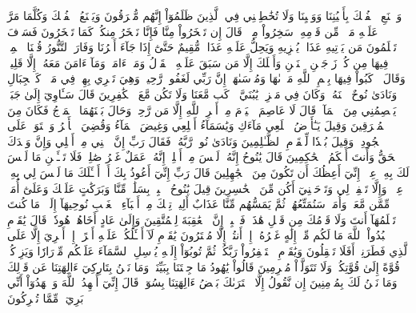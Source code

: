 وَٱصۡنَعِ ٱلۡفُلۡكَ بِأَعۡيُنِنَا وَوَحۡيِنَا وَلَا تُخَٰطِبۡنِي فِي ٱلَّذِينَ ظَلَمُوٓاْ إِنَّهُم مُّغۡرَقُونَ
وَيَصۡنَعُ ٱلۡفُلۡكَ وَكُلَّمَا مَرَّ عَلَيۡهِ مَلَأٞ مِّن قَوۡمِهِۦ سَخِرُواْ مِنۡهُۚ قَالَ إِن تَسۡخَرُواْ مِنَّا فَإِنَّا نَسۡخَرُ مِنكُمۡ كَمَا تَسۡخَرُونَ
فَسَوۡفَ تَعۡلَمُونَ مَن يَأۡتِيهِ عَذَابٞ يُخۡزِيهِ وَيَحِلُّ عَلَيۡهِ عَذَابٞ مُّقِيمٌ
حَتَّىٰٓ إِذَا جَآءَ أَمۡرُنَا وَفَارَ ٱلتَّنُّورُ قُلۡنَا ٱحۡمِلۡ فِيهَا مِن كُلّٖ زَوۡجَيۡنِ ٱثۡنَيۡنِ وَأَهۡلَكَ إِلَّا مَن سَبَقَ عَلَيۡهِ ٱلۡقَوۡلُ وَمَنۡ ءَامَنَۚ وَمَآ ءَامَنَ مَعَهُۥٓ إِلَّا قَلِيلٞ
۞وَقَالَ ٱرۡكَبُواْ فِيهَا بِسۡمِ ٱللَّهِ مَجۡرٜىٰهَا وَمُرۡسَىٰهَآۚ إِنَّ رَبِّي لَغَفُورٞ رَّحِيمٞ
وَهِيَ تَجۡرِي بِهِمۡ فِي مَوۡجٖ كَٱلۡجِبَالِ وَنَادَىٰ نُوحٌ ٱبۡنَهُۥ وَكَانَ فِي مَعۡزِلٖ يَٰبُنَيَّ ٱرۡكَب مَّعَنَا وَلَا تَكُن مَّعَ ٱلۡكَٰفِرِينَ
قَالَ سَـَٔاوِيٓ إِلَىٰ جَبَلٖ يَعۡصِمُنِي مِنَ ٱلۡمَآءِۚ قَالَ لَا عَاصِمَ ٱلۡيَوۡمَ مِنۡ أَمۡرِ ٱللَّهِ إِلَّا مَن رَّحِمَۚ وَحَالَ بَيۡنَهُمَا ٱلۡمَوۡجُ فَكَانَ مِنَ ٱلۡمُغۡرَقِينَ
وَقِيلَ يَـٰٓأَرۡضُ ٱبۡلَعِي مَآءَكِ وَيَٰسَمَآءُ أَقۡلِعِي وَغِيضَ ٱلۡمَآءُ وَقُضِيَ ٱلۡأَمۡرُ وَٱسۡتَوَتۡ عَلَى ٱلۡجُودِيِّۖ وَقِيلَ بُعۡدٗا لِّلۡقَوۡمِ ٱلظَّـٰلِمِينَ
وَنَادَىٰ نُوحٞ رَّبَّهُۥ فَقَالَ رَبِّ إِنَّ ٱبۡنِي مِنۡ أَهۡلِي وَإِنَّ وَعۡدَكَ ٱلۡحَقُّ وَأَنتَ أَحۡكَمُ ٱلۡحَٰكِمِينَ
قَالَ يَٰنُوحُ إِنَّهُۥ لَيۡسَ مِنۡ أَهۡلِكَۖ إِنَّهُۥ عَمَلٌ غَيۡرُ صَٰلِحٖۖ فَلَا تَسۡـَٔلۡنِ مَا لَيۡسَ لَكَ بِهِۦ عِلۡمٌۖ إِنِّيٓ أَعِظُكَ أَن تَكُونَ مِنَ ٱلۡجَٰهِلِينَ
قَالَ رَبِّ إِنِّيٓ أَعُوذُ بِكَ أَنۡ أَسۡـَٔلَكَ مَا لَيۡسَ لِي بِهِۦ عِلۡمٞۖ وَإِلَّا تَغۡفِرۡ لِي وَتَرۡحَمۡنِيٓ أَكُن مِّنَ ٱلۡخَٰسِرِينَ
قِيلَ يَٰنُوحُ ٱهۡبِطۡ بِسَلَٰمٖ مِّنَّا وَبَرَكَٰتٍ عَلَيۡكَ وَعَلَىٰٓ أُمَمٖ مِّمَّن مَّعَكَۚ وَأُمَمٞ سَنُمَتِّعُهُمۡ ثُمَّ يَمَسُّهُم مِّنَّا عَذَابٌ أَلِيمٞ
تِلۡكَ مِنۡ أَنۢبَآءِ ٱلۡغَيۡبِ نُوحِيهَآ إِلَيۡكَۖ مَا كُنتَ تَعۡلَمُهَآ أَنتَ وَلَا قَوۡمُكَ مِن قَبۡلِ هَٰذَاۖ فَٱصۡبِرۡۖ إِنَّ ٱلۡعَٰقِبَةَ لِلۡمُتَّقِينَ
وَإِلَىٰ عَادٍ أَخَاهُمۡ هُودٗاۚ قَالَ يَٰقَوۡمِ ٱعۡبُدُواْ ٱللَّهَ مَا لَكُم مِّنۡ إِلَٰهٍ غَيۡرُهُۥٓۖ إِنۡ أَنتُمۡ إِلَّا مُفۡتَرُونَ
يَٰقَوۡمِ لَآ أَسۡـَٔلُكُمۡ عَلَيۡهِ أَجۡرًاۖ إِنۡ أَجۡرِيَ إِلَّا عَلَى ٱلَّذِي فَطَرَنِيٓۚ أَفَلَا تَعۡقِلُونَ
وَيَٰقَوۡمِ ٱسۡتَغۡفِرُواْ رَبَّكُمۡ ثُمَّ تُوبُوٓاْ إِلَيۡهِ يُرۡسِلِ ٱلسَّمَآءَ عَلَيۡكُم مِّدۡرَارٗا وَيَزِدۡكُمۡ قُوَّةً إِلَىٰ قُوَّتِكُمۡ وَلَا تَتَوَلَّوۡاْ مُجۡرِمِينَ
قَالُواْ يَٰهُودُ مَا جِئۡتَنَا بِبَيِّنَةٖ وَمَا نَحۡنُ بِتَارِكِيٓ ءَالِهَتِنَا عَن قَوۡلِكَ وَمَا نَحۡنُ لَكَ بِمُؤۡمِنِينَ
إِن نَّقُولُ إِلَّا ٱعۡتَرَىٰكَ بَعۡضُ ءَالِهَتِنَا بِسُوٓءٖۗ قَالَ إِنِّيٓ أُشۡهِدُ ٱللَّهَ وَٱشۡهَدُوٓاْ أَنِّي بَرِيٓءٞ مِّمَّا تُشۡرِكُونَ

